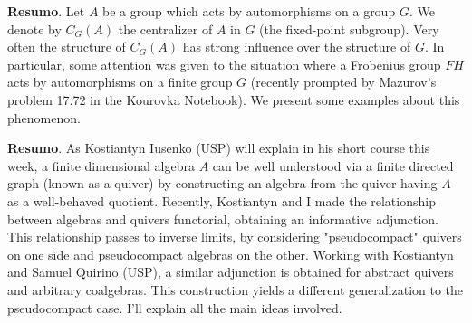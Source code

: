 	
	\vspace{24pt}
	
	
	
	\noindent\textbf{Resumo}.\label{jhone} 
	Let $A$ be a group which acts by automorphisms on a group $G$. We denote by  $C_G(A)$  the centralizer of $A$ in $G$ (the fixed-point subgroup). Very often the structure of $C_G(A)$ has strong influence over the structure of $G$. In particular, some attention was given to the situation where a Frobenius group $FH$ acts by automorphisms on a finite group $G$ (recently prompted by Mazurov's problem 17.72 in the Kourovka Notebook). We present some examples about this phenomenon.
	
	\vspace{24pt}
	
	
	\noindent\textbf{Resumo}.\label{jmq} 
	As Kostiantyn Iusenko (USP) will explain in his short course this week, a finite dimensional algebra $A$ can be well understood via a finite directed graph (known as a quiver) by constructing an algebra from the quiver having $A$ as a well-behaved quotient.  Recently, Kostiantyn and I made the relationship between algebras and quivers functorial, obtaining an informative adjunction.  This relationship passes to inverse limits, by considering "pseudocompact" quivers on one side and pseudocompact algebras on the other. Working with Kostiantyn and Samuel Quirino (USP), a similar adjunction is obtained for abstract quivers and arbitrary coalgebras.  This construction yields a different generalization to the pseudocompact case.  I'll explain all the main ideas involved.
	
	\vspace{24pt}
	
	
